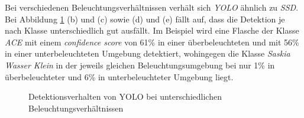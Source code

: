 Bei verschiedenen Beleuchtungsverhältnissen verhält sich \textit{YOLO} ähnlich zu \textit{SSD}. Bei Abbildung \ref{sicht_yolo} (b) und (c) sowie (d) und (e) fällt auf, dass die Detektion je nach Klasse unterschiedlich gut ausfällt. Im Beispiel wird eine Flasche der Klasse \textit{ACE} mit einem \textit{confidence score} von 61\% in einer überbeleuchteten und mit 56\% in einer unterbeleuchteten Umgebung detektiert, wohingegen die Klasse \textit{Saskia Wasser Klein} in der jeweils gleichen Beleuchtungsumgebung bei nur 1\% in überbeleuchteter und 6\% in unterbeleuchteter Umgebung liegt.
 
\begin{figure}[H]
 	\hfill
 	\hfill
 	\hfill
 	\hfill
	\hfill
 	\caption{Detektionsverhalten von YOLO bei unterschiedlichen Beleuchtungsverhältnissen}
 	\label{sicht_yolo}
\end{figure}


